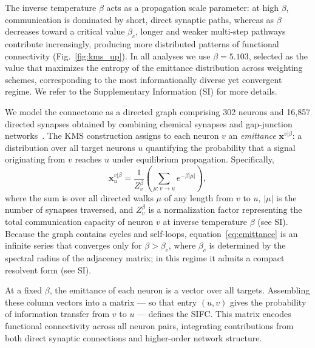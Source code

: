 \documentclass[prx,superscriptaddres, twocolumn]{revtex4-2}
\begin{document}
The inverse temperature $\beta$ acts as a propagation scale parameter: at high $\beta$,
communication is dominated by short, direct synaptic paths, whereas as $\beta$ decreases
toward a critical value $\beta_c$, longer and weaker multi-step pathways contribute
increasingly, producing more distributed patterns of functional connectivity
(Fig.~\ref{fig:kms_up}). In all analyses we use $\beta = 5.103$, selected as the value
that maximizes the entropy of the emittance distribution across weighting schemes,
corresponding to the most informationally diverse yet convergent regime. We refer to the Supplementary Information (SI) for more details.

We model the connectome as a directed graph comprising 302 neurons and 16,857 directed
synapses obtained by combining chemical synapses and gap-junction networks~\cite{
varshney2011structural,cook2019connectome,moutuou2025brain}. The KMS construction assigns
to each neuron $v$ an \emph{emittance} $\mathbf{x}^{v|\beta}$: a distribution over all
target neurons $u$ quantifying the probability that a signal originating from $v$ reaches
$u$ under equilibrium propagation. Specifically,
\begin{equation}
\mathbf{x}^{v|\beta}_{u} = \frac{1}{Z^{\beta}_{v}}
\left( \sum_{\mu: v \to u} e^{-\beta|\mu|}\right),
\label{eq:emittance}
\end{equation}
where the sum is over all directed walks $\mu$ of any length from $v$ to $u$, $|\mu|$ is
the number of synapses traversed, and $Z^{\beta}_{v}$ is a normalization factor
representing the total communication capacity of neuron $v$ at inverse temperature $\beta$
(see SI). Because the graph contains cycles and self-loops, equation~\eqref{eq:emittance}
is an infinite series that converges only for $\beta > \beta_c$, where $\beta_c$ is
determined by the spectral radius of the adjacency matrix; in this regime it admits a
compact resolvent form (see SI).

At a fixed $\beta$, the emittance of each neuron is a vector over all targets. Assembling
these column vectors into a matrix --- so that entry $(u,v)$ gives the probability of
information transfer from $v$ to $u$ --- defines the SIFC. This matrix encodes functional
connectivity across all neuron pairs, integrating contributions from both direct synaptic
connections and higher-order network structure.
\end{document}
